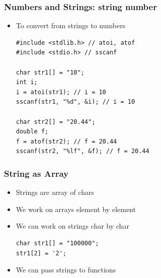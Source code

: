 \documentclass{../c-lecture}
\begin{document}
\begin{frame}[fragile]
  \frametitle{Numbers and Strings: string \textrightarrow number}
  \begin{itemize}
    \item To convert from strings to numbers
    \begin{verbatim}
#include <stdlib.h> // atoi, atof
#include <stdio.h> // sscanf

char str1[] = "10";
int i;
i = atoi(str1); // i = 10
sscanf(str1, "%d", &i); // i = 10

char str2[] = "20.44";
double f;
f = atof(str2); // f = 20.44
sscanf(str2, "%lf", &f); // f = 20.44
    \end{verbatim}
  \end{itemize}
\end{frame}

\begin{frame}[fragile]
  \frametitle{String as Array}
  \begin{itemize}
    \item Strings are array of chars
    \item We work on arrays element by element
    \item We can work on strings char by char
    \begin{verbatim}
char str1[] = "100000";
str1[2] = '2';
    \end{verbatim}
    \item We can pass strings to functions
  \end{itemize}
\end{frame}
\end{document}
